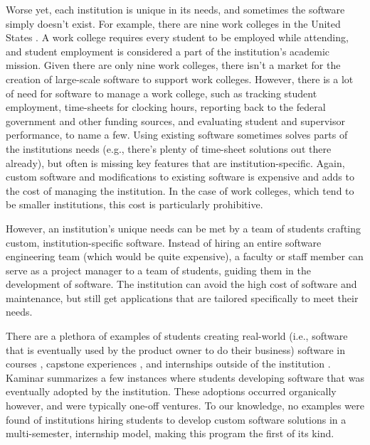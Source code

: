 Worse yet, each institution is unique in its needs, and sometimes the software simply doesn't exist. For example, there are nine work colleges in the United States \cite{WCCMembers, Ecclesia}. A work college requires every student to be employed while attending, and student employment is considered a part of the institution's academic mission. Given there are only nine work colleges, there isn't a market for the creation of large-scale software to support work colleges. However, there is a lot of need for software to manage a work college, such as tracking student employment, time-sheets for clocking hours, reporting back to the federal government and other funding sources, and evaluating student and supervisor performance, to name a few. Using existing software sometimes solves parts of the institutions needs (e.g., there's plenty of time-sheet solutions out there already), but often is missing key features that are institution-specific. Again, custom software and modifications to existing software is expensive and adds to the cost of managing the institution. In the case of work colleges, which tend to be smaller institutions, this cost is particularly prohibitive. 

However, an institution's unique needs can be met by a team of students crafting custom, institution-specific software. Instead of hiring an entire software engineering team (which would be quite expensive), a faculty or staff member can serve as a project manager to a team of students, guiding them in the development of software. The institution can avoid the high cost of software and maintenance, but still get applications that are tailored specifically to meet their needs. 

There are a plethora of examples of students creating real-world (i.e., software that is eventually used by the product owner to do their business) software in courses \cite{coursevsproject, tadayon2004software}, capstone experiences \cite{keogh2007scalable, capstone}, and internships outside of the institution \cite{rochesterfirstundergradsoftwareteam}. Kaminar \cite{kaminer_2014} summarizes a few instances where students developing software that was eventually adopted by the institution. These adoptions occurred organically however, and were typically one-off ventures. To our knowledge, no examples were found of institutions hiring students to develop custom software solutions in a multi-semester, internship model, making this program the first of its kind. 

